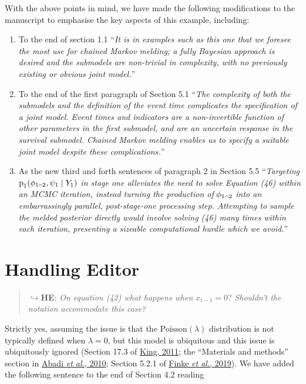 \documentclass[
  10pt,
  a4paper,
]{article}
\providecommand{\tightlist}{%
  \setlength{\itemsep}{0pt}\setlength{\parskip}{0pt}}
\let\Oldcap\cap
\renewcommand{\cap}{\mathrel{\mathsmaller{\Oldcap}}}
\newcommand{\pd}{\text{p}}
\begin{document}
With the above points in mind, we have made the following modifications
to the manuscript to emphasise the key aspects of this example,
including:

\begin{enumerate}
\def\labelenumi{\arabic{enumi}.}
\tightlist
\item
  To the end of section 1.1 ``\emph{It is in examples such as this one
  that we foresee the most use for chained Markov melding; a fully
  Bayesian approach is desired and the submodels are non-trivial in
  complexity, with no previously existing or obvious joint model.}''
\item
  To the end of the first paragraph of Section 5.1 ``\emph{The
  complexity of both the submodels and the definition of the event time
  complicates the specification of a joint model. Event times and
  indicators are a non-invertible function of other parameters in the
  first submodel, and are an uncertain response in the survival
  submodel. Chained Markov melding enables us to specify a suitable
  joint model despite these complications.}''
\item
  As the new third and forth sentences of paragraph 2 in Section 5.5
  ``\emph{Targeting} \(\pd_{1}(\phi_{1 \cap 2}, \psi_{1} \mid Y_{1})\)
  \emph{in stage one alleviates the need to solve Equation (46) within
  an MCMC iteration, instead turning the production of}
  \(\phi_{1 \cap 2}\) \emph{into an embarrassingly parallel,
  post-stage-one processing step. Attempting to sample the melded
  posterior directly would involve solving (46) many times within each
  iteration, presenting a sizeable computational hurdle which we
  avoid.}''
\end{enumerate}

\hypertarget{handling-editor}{%
\section*{Handling Editor}\label{handling-editor}}

\begin{quote}
\(\hookrightarrow\)\textbf{HE}: \emph{On equation (42) what happens
when} \(x_{t - 1} = 0\)? \emph{Shouldn't the notation accommodate this
case?}
\end{quote}

Strictly yes, assuming the issue is that the \(\text{Poisson}(\lambda)\)
distribution is not typically defined when \(\lambda = 0\), but this
model is ubiquitous and this issue is ubiquitously ignored (Section 17.3
of \protect\hyperlink{ref-king_statistical_2011}{King, 2011}; the
``Materials and methods'' section in
\protect\hyperlink{ref-abadi_estimation_2010}{Abadi \emph{et al.},
2010}; Section 5.2.1 of
\protect\hyperlink{ref-finke_efficient_2019}{Finke \emph{et al.},
2019}). We have added the following sentence to the end of Section 4.2
reading
\end{document}
